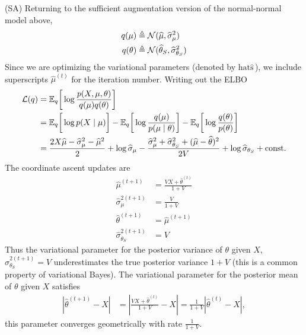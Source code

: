 \documentclass{article}
\begin{document}
 (SA) Returning to the sufficient augmentation version of the normal-normal model above, 
\begin{align}
q(\mu)
&\triangleq \mathcal{N}(\widehat\mu,\widehat\sigma_\mu^2) \\
q(\theta)
&\triangleq \mathcal{N}(\widehat\theta_S,\widehat\sigma_{\theta_S}^2)
\end{align}
Since we are optimizing the variational parameters (denoted by $\text{hat}\widehat{\text{s}}\,$), we include superscripts $\widehat\mu^{(t)}$ for the iteration number. Writing out the ELBO
\begin{align*}
\cl(q)
&=\EE_{q}\bigg[\log \frac{p(X,\mu,\theta)}{q(\mu)q(\theta)}\bigg] \\
&=  \EE_{q}\bigg[\log p(X\mid \mu)\bigg]
-  \EE_{q}\bigg[\log\frac{q(\mu)}{p(\mu\mid \theta)} \bigg]
-  \EE_{q}\bigg[\log \frac{q(\theta)}{p(\theta)}\bigg] \\
&=  \frac{2X\widehat\mu -  \widehat\sigma_{\mu}^{2} - \widehat\mu^{2}}{2} %
+\log\widehat\sigma_\mu - \frac{\widehat\sigma_\mu^{2}+\widehat\sigma_{\theta_S}^{2} + (\widehat\mu-\widehat\theta)^2}{2V}
+\log \widehat{\sigma}_{\theta_S} 
+ \text{const.}
\end{align*}
The coordinate ascent updates are
\begin{align}
\widehat\mu^{(t+1)}
&= \frac{VX + \widehat\theta^{(t)}}{1+V} \\
\widehat\sigma^{2(t+1)}_{\mu}
&= \frac{V}{1+V} \\
\widehat\theta^{(t+1)}
&= \widehat\mu^{(t+1)} \\
\widehat\sigma^{2(t+1)}_{\theta_S}
&= V
\end{align}
Thus the variational parameter for the posterior variance of $\theta$ given $X$, $\widehat\sigma^{2(t+1)}_{\theta_S}= V$ underestimates the true posterior variance $1+V$ (this is a common property of variational Bayes). The variational parameter for the posterior mean of $\theta$ given $X$ satisfies
\begin{align}
\left|\widehat\theta^{(t+1)} - X\right|
&= \left|\frac{VX + \widehat\theta^{(t)}}{1+V} - X\right| 
= \frac{1}{1+V} \left|\widehat\theta^{(t)}-X\right|,
\end{align}
this parameter converges geometrically with rate $\frac{1}{1+V}$. \\

\newpage
\end{document}
